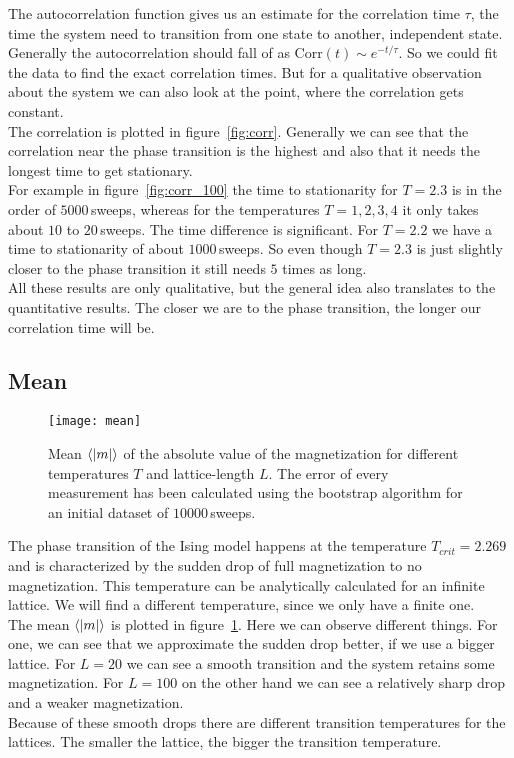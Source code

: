 The autocorrelation function gives us an estimate for the correlation time $\tau$, the time the system need to transition from one state to another, independent state. Generally the autocorrelation should fall of as Corr$(t) \sim e^{-t/\tau}$. So we could fit the data to find the exact correlation times. But for a qualitative observation about the system we can also look at the point, where the correlation gets constant.\\
The correlation is plotted in figure~\ref{fig:corr}. Generally we can see that the correlation near the phase transition is the highest and also that it needs the longest time to get stationary.\\
For example in figure~\ref{fig:corr_100} the time to stationarity for $T=2.3$ is in the order of $5000\, $sweeps, whereas for the temperatures $T=1, 2, 3, 4$ it only takes about $10$ to $20\,$sweeps. The time difference is significant. For $T=2.2$ we have a time to stationarity of about $1000 \,$sweeps. So even though $T=2.3$ is just slightly closer to the phase transition it still needs $5$ times as long.\\
All these results are only qualitative, but the general idea also translates to the quantitative results. The closer we are to the phase transition, the longer our correlation time will be.


\subsection{Mean}

\begin{figure}
  \centering
  \texttt{[image: mean]}
  \caption{Mean $\left\langle\left\vert m \right\vert\right\rangle$ of the absolute value of the  magnetization for different temperatures $T$ and lattice-length $L$. The error of every measurement has been calculated using the bootstrap algorithm for an initial dataset of $10000\,$sweeps.}\label{fig:mean}
\end{figure}

The phase transition of the Ising model happens at the temperature $T_{crit} = 2.269$ and is characterized by the sudden drop of full magnetization to no magnetization. This temperature can be analytically calculated for an infinite lattice. We will find a different temperature, since we only have a finite one.\\
The mean $\left\langle\left\vert m \right\vert\right\rangle$ is plotted in figure~\ref{fig:mean}. Here we can observe different things. For one, we can see that we approximate the sudden drop better, if we use a bigger lattice. For $L=20$ we can see a smooth transition and the system retains some magnetization. For $L=100$ on the other hand we can see a relatively sharp drop and a weaker magnetization.\\
Because of these smooth drops there are different transition temperatures for the lattices. The smaller the lattice, the bigger the transition temperature.\\

